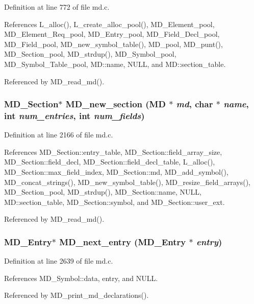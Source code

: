 Definition at line 772 of file md.c.

References L\_\-alloc(), L\_\-create\_\-alloc\_\-pool(), MD\_\-Element\_\-pool, MD\_\-Element\_\-Req\_\-pool, MD\_\-Entry\_\-pool, MD\_\-Field\_\-Decl\_\-pool, MD\_\-Field\_\-pool, MD\_\-new\_\-symbol\_\-table(), MD\_\-pool, MD\_\-punt(), MD\_\-Section\_\-pool, MD\_\-strdup(), MD\_\-Symbol\_\-pool, MD\_\-Symbol\_\-Table\_\-pool, MD::name, NULL, and MD::section\_\-table.

Referenced by MD\_\-read\_\-md().
\subsubsection{\setlength{\rightskip}{0pt plus 5cm}\bf{MD\_\-Section}$\ast$ MD\_\-new\_\-section (\bf{MD} $\ast$ {\em md}, char $\ast$ {\em name}, int {\em num\_\-entries}, int {\em num\_\-fields})}\label{md_8h_21a0861671d703189c6506f9583453a0}




Definition at line 2166 of file md.c.

References MD\_\-Section::entry\_\-table, MD\_\-Section::field\_\-array\_\-size, MD\_\-Section::field\_\-decl, MD\_\-Section::field\_\-decl\_\-table, L\_\-alloc(), MD\_\-Section::max\_\-field\_\-index, MD\_\-Section::md, MD\_\-add\_\-symbol(), MD\_\-concat\_\-strings(), MD\_\-new\_\-symbol\_\-table(), MD\_\-resize\_\-field\_\-arrays(), MD\_\-Section\_\-pool, MD\_\-strdup(), MD\_\-Section::name, NULL, MD::section\_\-table, MD\_\-Section::symbol, and MD\_\-Section::user\_\-ext.

Referenced by MD\_\-read\_\-md().
\subsubsection{\setlength{\rightskip}{0pt plus 5cm}\bf{MD\_\-Entry}$\ast$ MD\_\-next\_\-entry (\bf{MD\_\-Entry} $\ast$ {\em entry})}\label{md_8h_f91910c190e1e376321633ee24e235c0}




Definition at line 2639 of file md.c.

References MD\_\-Symbol::data, entry, and NULL.

Referenced by MD\_\-print\_\-md\_\-declarations().
